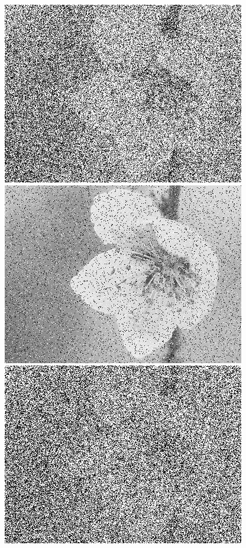\documentclass[10pt,aspectratio=43,mathserif]{beamer}
\begin{document}
\begin{frame}
\begin{columns}
\includegraphics[scale=0.2]{exp-2.jpg}
\includegraphics[scale=0.2]{exp-6.jpg}
\includegraphics[scale=0.2]{exp-10.jpg}


\end{columns}
\end{frame}
\end{document}
